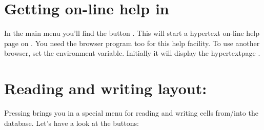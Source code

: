 \section{Getting on-line help in \protect{}}
In the main menu you'll find the button . This will start a
hypertext on-line help page on .
You need the browser program  too for this help facility.
To use another browser, set the  environment variable.
Initially it will display the hypertextpage .

\section{Reading and writing layout: \protect{}}
Pressing  brings you in a special menu
for reading and writing cells from/into the database. Let's have a look
at the buttons:
